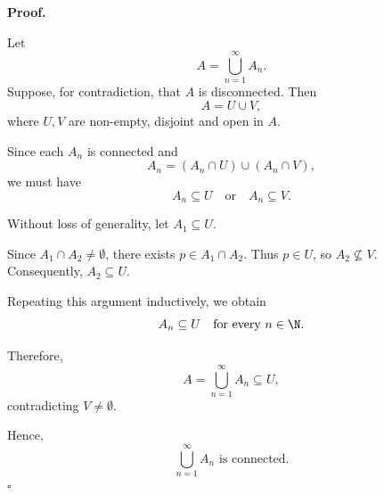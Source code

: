 
\textbf{Proof.}

Let
\[ A=\bigcup_{n=1}^{\infty}A_n. \]
Suppose, for contradiction, that $A$ is disconnected. Then
\[ A=U\cup V, \]
where $U,V$ are non-empty, disjoint and open in $A$.

Since each $A_n$ is connected and
\[ A_n=(A_n\cap U)\cup(A_n\cap V), \]
we must have
\[ A_n\subseteq U\quad\text{or}\quad A_n\subseteq V. \]

Without loss of generality, let $A_1\subseteq U$.

Since $A_1\cap A_2\neq\emptyset$, there exists $p\in A_1\cap A_2$. Thus $p\in U$, so
$A_2\not\subseteq V$. Consequently, $A_2\subseteq U$.

Repeating this argument inductively, we obtain
\[ A_n\subseteq U\quad\text{for every }n\in\N. \]

Therefore,
\[ A=\bigcup_{n=1}^{\infty}A_n\subseteq U, \]
contradicting $V\neq\emptyset$.

Hence,
\[ \boxed{\bigcup_{n=1}^{\infty}A_n\text{ is connected.}} \]
\hfill $\square$
